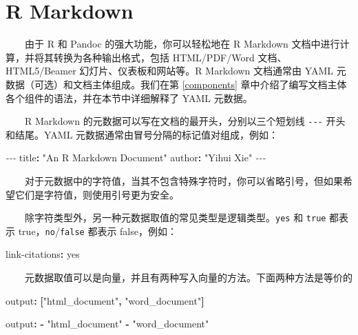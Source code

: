 \documentclass[
  12pt,
]{krantz}
\newenvironment{Shaded}{\begin{snugshade}}{\end{snugshade}}
\newcommand{\AttributeTok}[1]{\textcolor[rgb]{0.77,0.63,0.00}{#1}}
\newcommand{\CharTok}[1]{\textcolor[rgb]{0.31,0.60,0.02}{#1}}
\newcommand{\FunctionTok}[1]{\textcolor[rgb]{0.00,0.00,0.00}{#1}}
\newcommand{\KeywordTok}[1]{\textcolor[rgb]{0.13,0.29,0.53}{\textbf{#1}}}
\newcommand{\PreprocessorTok}[1]{\textcolor[rgb]{0.56,0.35,0.01}{\textit{#1}}}
\newcommand{\StringTok}[1]{\textcolor[rgb]{0.31,0.60,0.02}{#1}}
\theoremstyle{definition}
\theoremstyle{definition}
\theoremstyle{definition}
\theoremstyle{definition}
\theoremstyle{remark}
\begin{document}
\hypertarget{r-markdown}{%
\section{R Markdown}\label{r-markdown}}

  由于 R 和 Pandoc 的强大功能，你可以轻松地在 R Markdown 文档中进行计算，并将其转换为各种输出格式，包括 HTML/PDF/Word 文档、HTML5/Beamer 幻灯片、仪表板和网站等。R Markdown 文档通常由 YAML 元数据（可选）和文档主体组成。我们在第 \ref{components} 章中介绍了编写文档主体各个组件的语法，并在本节中详细解释了 YAML 元数据。

  R Markdown 的元数据可以写在文档的最开头，分别以三个短划线 \texttt{-\/-\/-} 开头和结尾。YAML 元数据通常由冒号分隔的标记值对组成，例如：

\begin{Shaded}
\begin{Highlighting}[]
\PreprocessorTok{{-}{-}{-}}
\FunctionTok{title}\KeywordTok{:}\AttributeTok{ }\StringTok{"An R Markdown Document"}
\FunctionTok{author}\KeywordTok{:}\AttributeTok{ }\StringTok{"Yihui Xie"}
\PreprocessorTok{{-}{-}{-}}
\end{Highlighting}
\end{Shaded}

  对于元数据中的字符值，当其不包含特殊字符时，你可以省略引号，但如果希望它们是字符值，则使用引号更为安全。

  除字符类型外，另一种元数据取值的常见类型是逻辑类型。\texttt{yes} 和 \texttt{true} 都表示 true，\texttt{no}/\texttt{false} 都表示 false，例如：

\begin{Shaded}
\begin{Highlighting}[]
\FunctionTok{link{-}citations}\KeywordTok{:}\AttributeTok{ }\CharTok{yes}
\end{Highlighting}
\end{Shaded}

  元数据取值可以是向量，并且有两种写入向量的方法。下面两种方法是等价的

\begin{Shaded}
\begin{Highlighting}[]
\FunctionTok{output}\KeywordTok{:}\AttributeTok{ }\KeywordTok{[}\StringTok{"html\_document"}\KeywordTok{,}\AttributeTok{ }\StringTok{"word\_document"}\KeywordTok{]}
\end{Highlighting}
\end{Shaded}

\begin{Shaded}
\begin{Highlighting}[]
\FunctionTok{output}\KeywordTok{:}
\AttributeTok{  }\KeywordTok{{-}}\AttributeTok{ }\StringTok{"html\_document"}
\AttributeTok{  }\KeywordTok{{-}}\AttributeTok{ }\StringTok{"word\_document"}
\end{Highlighting}
\end{Shaded}
\end{document}

